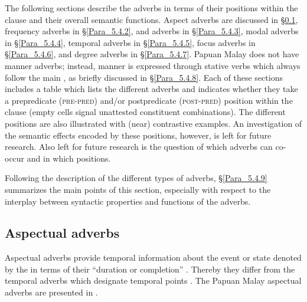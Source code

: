The following sections describe the adverbs in terms of their positions within the clause and their overall semantic functions. Aspect adverbs are discussed in §\ref{Para_5.4.1}, frequency adverbs in §\ref{Para_5.4.2},  and  adverbs in §\ref{Para_5.4.3}, modal adverbs in §\ref{Para_5.4.4}, temporal adverbs in §\ref{Para_5.4.5}, focus adverbs in §\ref{Para_5.4.6}, and degree adverbs in §\ref{Para_5.4.7}. Papuan Malay does not have manner adverbs; instead, manner is expressed through stative verbs which always follow the main , as briefly discussed in §\ref{Para_5.4.8}. Each of these sections includes a table which lists the different adverbs and indicates whether they take a prepredicate (\textsc{pre-pred}) and/or postpredicate (\textsc{post-pred}) position within the clause (empty cells signal unattested constituent combinations). The different positions are also illustrated with (near) contrastive examples. An investigation of the semantic effects encoded by these positions, however, is left for future research. Also left for future research is the question of which adverbs can co-occur and in which positions.



Following the description of the different types of adverbs, §\ref{Para_5.4.9} summarizes the main points of this section, especially with respect to the interplay between syntactic properties and functions of the adverbs.


\subsection{Aspectual adverbs}
\label{Para_5.4.1}
Aspectual adverbs provide temporal information about the event or state denoted by the  in terms of their “duration or completion” {\citep[5094]{Asher.1994}}. Thereby they differ from the temporal adverbs which designate temporal points \citep[91–92]{Givon.2001}. The Papuan Malay aspectual adverbs are presented in .



